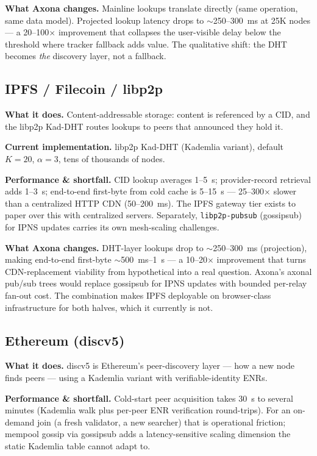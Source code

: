 \documentclass[nobib]{tufte-handout}
\begin{document}
\textbf{What Axona changes.} Mainline lookups translate directly (same
operation, same data model). Projected lookup latency drops to
$\sim$250--300~ms at 25K nodes --- a 20--100$\times$ improvement that
collapses the user-visible delay below the threshold where tracker
fallback adds value. The qualitative shift: the DHT becomes \emph{the}
discovery layer, not a fallback.

\subsection{IPFS / Filecoin / libp2p}

\textbf{What it does.} Content-addressable storage: content is
referenced by a CID, and the libp2p Kad-DHT routes lookups to peers
that announced they hold it.

\textbf{Current implementation.} libp2p Kad-DHT (Kademlia variant),
default $K{=}20$, $\alpha{=}3$, tens of thousands of nodes.

\textbf{Performance \& shortfall.} CID lookup averages 1--5~s;
provider-record retrieval adds 1--3~s; end-to-end first-byte from cold
cache is 5--15~s --- 25--300$\times$ slower than a centralized HTTP CDN
(50--200~ms). The IPFS gateway tier exists to paper over this with
centralized servers. Separately, \texttt{libp2p-pubsub} (gossipsub) for
IPNS updates carries its own mesh-scaling challenges.

\textbf{What Axona changes.} DHT-layer lookups drop to
$\sim$250--300~ms (projection), making end-to-end first-byte
$\sim$500~ms--1~s --- a 10--20$\times$ improvement that turns
CDN-replacement viability from hypothetical into a real question.
Axona's axonal pub/sub trees would replace gossipsub for IPNS updates
with bounded per-relay fan-out cost. The combination makes IPFS
deployable on browser-class infrastructure for both halves, which it
currently is not.

\subsection{Ethereum (discv5)}

\textbf{What it does.} discv5 is Ethereum's peer-discovery layer --- how
a new node finds peers --- using a Kademlia variant with
verifiable-identity ENRs.

\textbf{Performance \& shortfall.} Cold-start peer acquisition takes
30~s to several minutes (Kademlia walk plus per-peer ENR verification
round-trips). For an on-demand join (a fresh validator, a new searcher)
that is operational friction; mempool gossip via gossipsub adds a
latency-sensitive scaling dimension the static Kademlia table cannot
adapt to.
\end{document}
